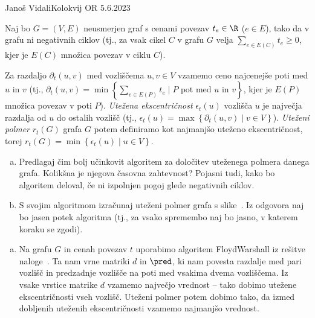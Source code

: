 \begin{naloga}{Janoš Vidali}{Kolokvij OR 5.6.2023}
\begin{vprasanje}
Naj bo $G = (V, E)$ neusmerjen graf s cenami povezav $t_e \in \R$ ($e \in E$),
tako da v grafu ni negativnih ciklov
(tj., za vsak cikel $C$ v grafu $G$ velja $\sum_{e \in E(C)} t_e \ge 0$,
kjer je $E(C)$ množica povezav v ciklu $C$).

Za razdaljo $\partial_t(u, v)$ med vozliščema $u, v \in V$ vzamemo
ceno najcenejše poti med $u$ in $v$
(tj.,
$\partial_t(u, v) = \min\left\{\sum_{e \in E(P)} t_e
\mid \text{$P$ pot med $u$ in $v$}\right\}$,
kjer je $E(P)$ množica povezav v poti $P$).
{\em Utežena ekscentričnost} $\epsilon_t(u)$ vozlišča $u$
je največja razdalja od $u$ do ostalih vozlišč
(tj., $\epsilon_t(u) = \max\left\{\partial_t(u, v) \mid v \in V\right\}$).
{\em Uteženi polmer} $r_t(G)$ grafa $G$ potem definiramo kot
najmanjšo uteženo ekscentričnost,
torej $r_t(G) = \min\left\{\epsilon_t(u) \mid u \in V\right\}$.

\begin{enumerate}[(a)]
\item Predlagaj čim bolj učinkovit algoritem
za določitev uteženega polmera danega grafa.
Kolikšna je njegova časovna zahtevnost?
Pojasni tudi, kako bo algoritem deloval,
če ni izpolnjen pogoj glede negativnih ciklov.

\item S svojim algoritmom izračunaj uteženi polmer grafa s slike~\fig.
Iz odgovora naj bo jasen potek algoritma
(tj., za vsako spremembo naj bo jasno, v katerem koraku se zgodi).
\end{enumerate}

\begin{slika}
\pgfslika
{}
\end{slika}
\end{vprasanje}

\begin{odgovor}
\begin{enumerate}[(a)]
\item Na grafu $G$ in cenah povezav $t$
uporabimo algoritem {\sc FloydWarshall} iz re\-šit\-ve naloge~\res[fw].
Ta nam vrne matriki $d$ in $\pred$,
ki nam povesta razdalje med pari vozlišč
in predzadnje vozlišče na poti med vsakima dvema vozliščema.
Iz vsake vrstice matrike $d$ vzamemo največjo vrednost
-- tako dobimo utežene ekscentričnosti vseh vozlišč.
Uteženi polmer potem dobimo tako,
da izmed dobljenih uteženih ekscentričnosti vzamemo najmanjšo vrednost.


\end{enumerate}
\end{odgovor}
\end{naloga}
